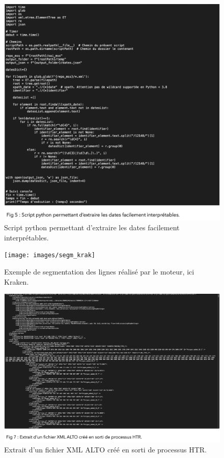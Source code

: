 \documentclass[a4paper,12pt,twoside]{book}
\begin{document}
\begin{figure}
	\centering
	\includegraphics[width=0.7\linewidth]{images/script_python_b}
	\caption{Script python permettant d’extraire les dates facilement interprétables.}
	\label{fig:scriptpythonb}
\end{figure}

\begin{figure}
	\centering
	\texttt{[image: images/segm\_krak]}
	\caption{Exemple de segmentation des lignes réalisé par le moteur, ici Kraken. }
	\label{fig:segmkrak}
\end{figure}

\begin{figure}
	\centering
	\includegraphics[width=0.7\linewidth]{images/ALTO_xml}
	\caption{Extrait d’un fichier XML ALTO créé en sorti de processus HTR.}
	\label{fig:altoxml}
\end{figure}
\end{document}

